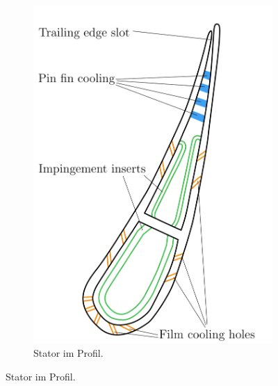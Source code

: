 \documentclass[8pt, aspectratio=169]{beamer}
\begin{document}
\begin{frame}
\begin{minipage}[t]{0.48\textwidth}
\begin{figure}[H]
\begin{subfigure}{.49\textwidth}
				\includegraphics[width=.9\textwidth]{../../assets/gth_rebuild/11.png}
				\caption{Stator im Profil.}
			\end{subfigure}
		\end{figure}
	\end{minipage}
	\vfill
\end{frame}
\end{document}
